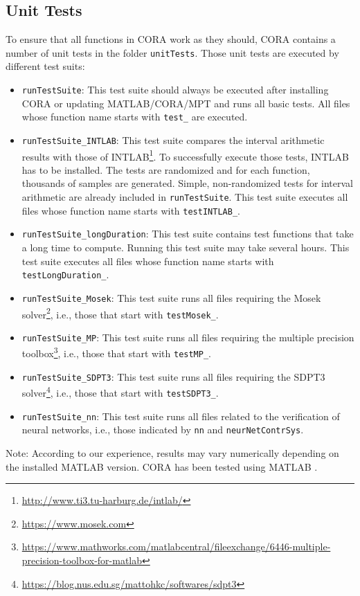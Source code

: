 \subsection{Unit Tests} \label{sec:unitTests}

To ensure that all functions in CORA work as they should, CORA contains a number of unit tests in the folder \texttt{unitTests}. Those unit tests are executed by different test suits:
\begin{itemize}
 \item \texttt{runTestSuite}: This test suite should always be executed after installing CORA or updating MATLAB/CORA/MPT and runs all basic tests. All files whose function name starts with \texttt{test\_} are executed.
 \item \texttt{runTestSuite\_INTLAB}: This test suite compares the interval arithmetic results with those of INTLAB\footnote{\url{http://www.ti3.tu-harburg.de/intlab/}}. To successfully execute those tests, INTLAB has to be installed. The tests are randomized and for each function, thousands of samples are generated. Simple, non-randomized tests for interval arithmetic are already included in \texttt{runTestSuite}. This test suite executes all files whose function name starts with \texttt{testINTLAB\_}.
 \item \texttt{runTestSuite\_longDuration}: This test suite contains test functions that take a long time to compute. Running this test suite may take several hours. This test suite executes all files whose function name starts with \texttt{testLongDuration\_}.
 \item \texttt{runTestSuite\_Mosek}: This test suite runs all files requiring the Mosek solver\footnote{\url{https://www.mosek.com}}, i.e., those that start with \texttt{testMosek\_}. 
 \item \texttt{runTestSuite\_MP}: This test suite runs all files requiring the multiple precision toolbox\footnote{\url{https://www.mathworks.com/matlabcentral/fileexchange/6446-multiple-precision-toolbox-for-matlab}}, i.e., those that start with \texttt{testMP\_}. 
 \item \texttt{runTestSuite\_SDPT3}: This test suite runs all files requiring the SDPT3 solver\footnote{\url{https://blog.nus.edu.sg/mattohkc/softwares/sdpt3}}, i.e., those that start with \texttt{testSDPT3\_}.
 \item \texttt{runTestSuite\_nn}: This test suite runs all files related to the verification of neural networks, i.e., those indicated by \texttt{nn} and \texttt{neurNetContrSys}.
\end{itemize}

Note: According to our experience, results may vary numerically depending on the installed MATLAB version.
CORA \CORAVERSION has been tested using MATLAB \MATLABversion.
